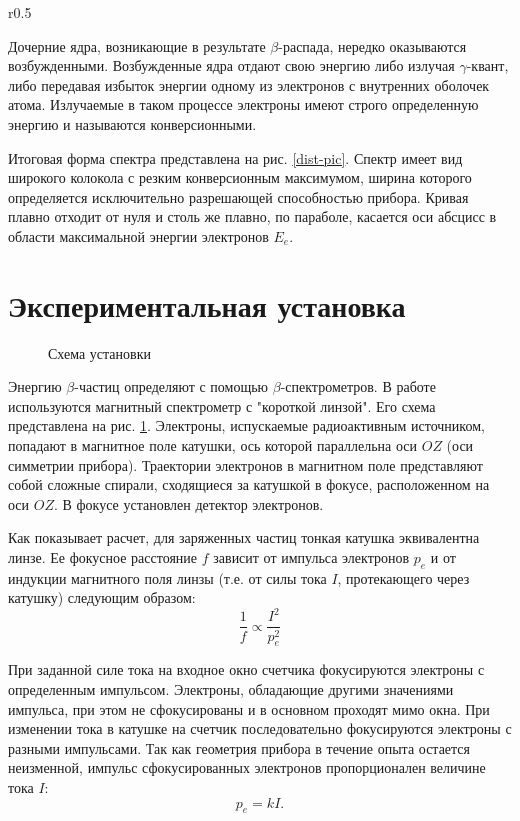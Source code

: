 \documentclass[12pt,a4paper]{article}
\begin{document}
\begin{wrapfigure}{r}{0.5\linewidth} \label{dist-pic} 
\vspace{-5ex}  
\caption{Форма спектра $\beta$-частиц}
\end{wrapfigure}

Дочерние ядра, возникающие в результате $\beta$-распада, нередко оказываются возбужденными. Возбужденные ядра отдают свою энергию либо излучая $\gamma$-квант, либо передавая избыток энергии одному из электронов с внутренних оболочек атома. Излучаемые в таком процессе электроны имеют строго определенную энергию и называются конверсионными.

Итоговая форма спектра представлена на рис. \ref{dist-pic}. 
Спектр имеет вид широкого колокола с резким конверсионным максимумом, ширина которого определяется исключительно разрешающей способностью прибора. Кривая плавно отходит от нуля и столь же плавно, по параболе, касается оси абсцисс в области максимальной энергии электронов $E_e$. 

\section{Экспериментальная установка}

\begin{figure}[ht!] \label{scheme} 
\caption{Схема установки}
\end{figure}

Энергию $\beta$-частиц определяют с помощью $\beta$-спектрометров. В работе используются магнитный спектрометр с "короткой линзой". Его схема представлена на рис. \ref{scheme}. Электроны, испускаемые радиоактивным источником, попадают в магнитное поле катушки, ось которой параллельна оси $OZ$ (оси симметрии прибора). Траектории электронов в магнитном поле представляют собой сложные спирали, сходящиеся за катушкой в фокусе, расположенном на оси $OZ$. В фокусе установлен детектор электронов.

Как показывает расчет, для заряженных частиц тонкая катушка эквивалентна линзе. Ее фокусное расстояние $f$ зависит от импульса электронов $p_e$ и от индукции магнитного поля линзы (т.е. от силы тока $I$, протекающего через катушку) следующим образом:
\begin{equation} \label{focus}
\frac{1}{f} \propto \frac{I^2}{p_e^2}
\end{equation}

При заданной силе тока на входное окно счетчика фокусируются электроны с определенным импульсом. Электроны, обладающие другими значениями импульса, при этом не сфокусированы и в основном проходят мимо окна. При изменении тока в катушке на счетчик последовательно фокусируются электроны с разными импульсами. Так как геометрия прибора в течение опыта остается неизменной, импульс сфокусированных электронов пропорционален величине тока $I$:
\begin{equation}
p_e = kI.
\end{equation}
\end{document}
